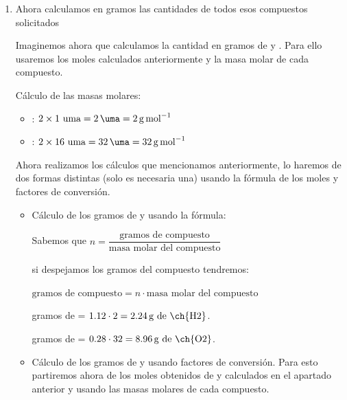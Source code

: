 \begin{enumerate}[label=\numberballmDarkTeal]
        Cálculo de los moles de 
        \begin{equation*}
            0.56\ \cancelred{\unit{\mol}\ \text{de \ch{H2O}}} \cdot \dfrac{\qty{2}{\mol}\ \text{de \ch{H2}}}{1\ \cancelred{\unit{\mol} \ \text{de \ch{H2O}}}} = \qty{1.12}{\mol}\ \text{de \ch{H2}}
        \end{equation*}
        Cálculo de los moles de 
        \begin{equation*}
            0.56\ \cancelred{\unit{\mol}\ \text{de \ch{H2O}}} \cdot \dfrac{\qty{1}{\mol}\ \text{de \ch{O2}}}{2\ \cancelred{\unit{\mol} \ \text{de \ch{H2O}}}} = \qty{0.28}{\mol}\ \text{de \ch{O2}}
        \end{equation*}
        \item Ahora calculamos en gramos las cantidades de todos esos compuestos solicitados

        Imaginemos ahora que calculamos la cantidad en gramos de  y .
        Para ello usaremos los moles calculados anteriormente y la masa molar de cada compuesto.

        Cálculo de las masas molares:
        \begin{itemize}
            \item {}: \( 2 \times 1 \text{ uma} = \qty{2}{\uma} =  \qty{2}{\g\per\mol} \)
            \item {}: \( 2 \times 16 \text{ uma} = \qty{32}{\uma} = \qty{32}{\g\per\mol} \)
        \end{itemize}

        Ahora realizamos los cálculos que mencionamos anteriormente, lo haremos de dos formas distintas (solo es necesaria una) usando la fórmula de los moles y factores de conversión.
        \begin{itemize}
            \item Cálculo de los gramos de  y  usando la fórmula:

            Sabemos que \( n = \dfrac{\text{gramos de compuesto}}{\text{masa molar del compuesto}} \)

            si despejamos los gramos del compuesto tendremos:

            \( \text{gramos de compuesto} = n\cdot \text{masa molar del compuesto} \)

            gramos de  = \( 1.12 \cdot 2 = \qty{2.24}{\g}\ \text{de \ch{H2}} \).

            gramos de  = \( 0.28 \cdot 32 = \qty{8.96}{\g}\ \text{de \ch{O2}} \).
            \item Cálculo de los gramos de  y  usando factores de conversión. Para esto partiremos ahora de los moles obtenidos de  y  calculados en el apartado anterior y usando las masas molares de cada compuesto.


\end{itemize}
\end{enumerate}
